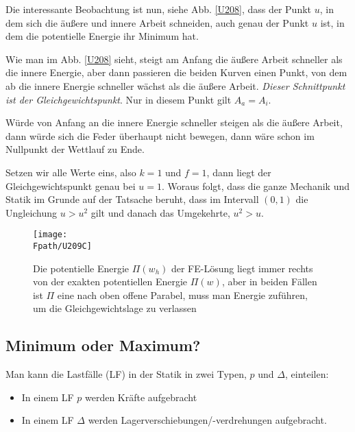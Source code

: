 {{{{{Die interessante Beobachtung ist nun, siehe Abb. \ref{U208}, dass der Punkt $u$, in dem sich die \"{a}u{\ss}ere und innere Arbeit schneiden,  auch genau der Punkt $u$ ist, in dem die potentielle Energie ihr Minimum hat.

Wie man im Abb. \ref{U208} sieht, steigt am Anfang die \"{a}u{\ss}ere Arbeit schneller als die innere Energie, aber dann passieren die beiden Kurven einen Punkt, von dem ab die innere Energie schneller w\"{a}chst als die \"{a}u{\ss}ere Arbeit. {\em Dieser Schnittpunkt ist der Gleichgewichtspunkt}. Nur in diesem Punkt gilt $A_a = A_i$.

W\"{u}rde von Anfang an die innere Energie schneller steigen als die \"{a}u{\ss}ere Arbeit, dann w\"{u}rde sich die Feder \"{u}berhaupt nicht bewegen, dann w\"{a}re schon im Nullpunkt der Wettlauf zu Ende.

Setzen wir alle Werte eins, also $ k = 1$ und $ f = 1 $, dann liegt der Gleich\-gewichtspunkt genau bei $ u = 1$. Woraus folgt, dass die ganze Mechanik und Statik im Grunde auf der Tatsache beruht, dass im Intervall $(0,1)$
die Ungleichung $u > u^2$ gilt und danach das Umgekehrte, $u^2 > u$.

\begin{figure}[tbp]
\centering
\if {} \sidecaption \fi
\texttt{[image: \\Fpath/U209C]}
\caption{Die potentielle Energie $\Pi(w_h)$ der FE-L\"{o}sung liegt
immer rechts von der exakten potentiellen Energie $\Pi(w)$, aber in beiden F\"{a}llen ist $\Pi$ eine nach oben offene Parabel, muss man Energie zuf\"{u}hren, um die Gleichgewichtslage zu verlassen} \label{U209}
\end{figure}%

{\textcolor{sectionTitleBlue}{\subsection{Minimum oder Maximum?}}}
Man kann die Lastf\"{a}lle (LF) in der Statik in zwei Typen, $p$ und $\Delta$, einteilen:\\

\begin{itemize}
  \item In einem LF $p$  werden Kr\"{a}fte aufgebracht
  \item In einem LF $\Delta$ werden Lagerverschiebungen/-verdrehungen aufgebracht.
\end{itemize}

}}}}}
